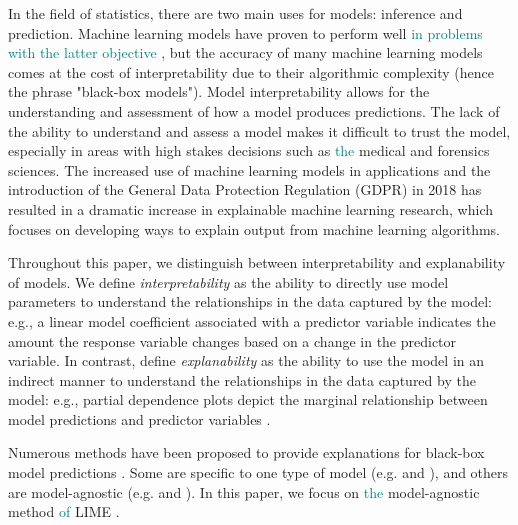 \documentclass[AMS,STIX2COL]{WileyNJD-v2}\usepackage[]{graphicx}\usepackage[]{color}
\newcommand{\kge}[1]{\textcolor{teal}{#1}}
\renewcommand{\sout}[1]{\unskip}
\begin{document}
In the field of statistics, there are two main uses for models: inference and prediction. Machine learning models \sout{are often used for the latter purpose. These models} have proven to perform well \kge{in problems with the latter objective} \sout{in a wide range of prediction problems}, but the accuracy of many machine learning models comes at the cost of interpretability due to their algorithmic complexity (hence the phrase "black-box models"). Model interpretability allows for the understanding and assessment of how a model produces predictions. The lack of the ability to understand and assess a model makes it difficult to trust the model, especially in areas with high stakes decisions such as \kge{the} medical and forensics sciences. The increased use of machine learning models in applications and the introduction of the General Data Protection Regulation (GDPR) in 2018 \citep{goodman:2016} has resulted in a dramatic increase in explainable machine learning research, which focuses on developing ways to explain output from machine learning algorithms.

Throughout this paper, we distinguish between interpretability and explanability of models. We define {\it interpretability} as the ability to directly use model parameters to understand the relationships in the data captured by the model: e.g., a linear model coefficient associated with a predictor variable indicates the amount the response variable changes based on a change in the predictor variable. In contrast, define {\it explanability} as the ability to use the model in an indirect manner to understand the relationships in the data captured by the model: e.g., partial dependence plots depict the marginal relationship between model predictions and predictor variables \citep{friedman:2001}.

Numerous methods have been proposed to provide explanations for black-box model predictions \citep{gilpin:2018, guidotti:2018, ming:2017, molnar:2019}. Some are specific to one type of model (e.g. \citep{simonyan:2013} and \citep{urbanek:2008}), and others are model-agnostic (e.g. \citep{fisher:2018} and \citep{strumbelj:2014}). In this paper, we focus on \kge{the} \sout{one specific} model-agnostic method\sout{:} \kge{of} LIME \citep{ribeiro:2016}.
\end{document}

